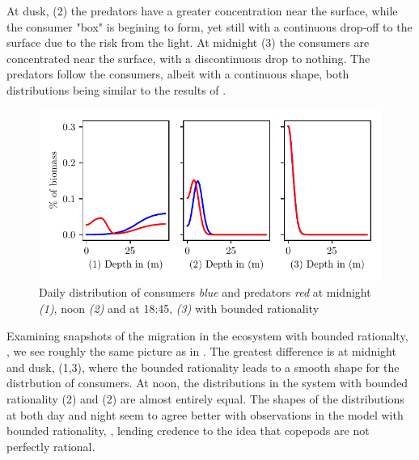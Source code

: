 At dusk, (2) the predators have a greater concentration near the surface, while the consumer "box" is begining to form, yet still with a continuous drop-off to the surface due to the risk from the light.
At midnight (3) the consumers are concentrated near the surface, with a discontinuous drop to nothing. The predators follow the consumers, albeit with a continuous shape, both distributions being similar to the results of \citep{verticalmigration}.
\begin{figure}[H]
\includegraphics{plots/specific_dists_semi_rational.pdf}
\caption{Daily distribution of consumers \emph{blue} and predators \emph{red} at midnight \emph{(1)}, noon \emph{(2)} and at 18:45, \emph{(3)} with bounded rationality}
\label{fig:specific_dists_semi_rational}
\end{figure}
Examining snapshots of the migration in the ecosystem with bounded rationalty, , we see roughly the same picture as in . The greatest difference is at midnight and dusk, (1,3), where the bounded rationality leads to a smooth shape for the distrbution of consumers. At noon, the distributions in the system with bounded rationality (2) and (2) are almost entirely equal. The shapes of the distributions at both day and night seem to agree better with observations in the model with bounded rationality, \citep{visser2001observations, hay1991zooplankton}, lending credence to the idea that copepods are not perfectly rational.

